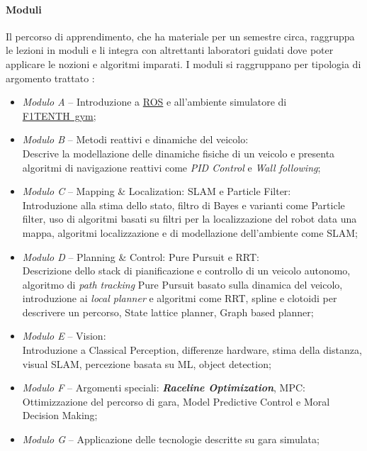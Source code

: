 \paragraph{Moduli}
Il percorso di apprendimento, che ha materiale per un semestre circa,
raggruppa le lezioni in moduli e li integra con altrettanti laboratori guidati
dove poter applicare le nozioni e algoritmi imparati.
\newpage %
\noindent I moduli si raggruppano per tipologia di argomento trattato \cite{f1learn}:
\begin{itemize}
	\item \textit{Modulo A} -- Introduzione a \hyperref[sec:ros]{ROS} e 
		all'ambiente simulatore di \hyperref[par:gym]{F1TENTH~gym};
	\item \textit{Modulo B} -- Metodi reattivi e dinamiche del veicolo: \\
	      Descrive la modellazione delle dinamiche fisiche di un veicolo e presenta algoritmi di navigazione
	      reattivi come \textit{PID Control} e \textit{Wall following};
	\item \textit{Modulo C} -- Mapping \& Localization: SLAM e Particle Filter:\\
	      Introduzione alla stima dello stato, filtro di Bayes e varianti come Particle filter, uso di
	      algoritmi basati su filtri per la localizzazione del robot data una mappa, algoritmi localizzazione e
	      di modellazione dell'ambiente come SLAM;
	\item \textit{Modulo D} -- Planning \& Control: Pure Pursuit e RRT:\\
	      Descrizione dello stack di pianificazione e controllo di un veicolo autonomo, algoritmo di
	      \textit{path tracking} Pure Pursuit basato sulla dinamica del veicolo, introduzione ai
	      \textit{local planner} e algoritmi come RRT, spline e clotoidi per descrivere un percorso,
	      State lattice planner, Graph based planner;
	\item \textit{Modulo E} -- Vision:\\
	      Introduzione a Classical Perception, differenze hardware, stima della distanza, visual SLAM,
	      percezione basata su ML, object detection;
	\item \textit{Modulo F} -- Argomenti speciali: \textbf{\textit{Raceline Optimization}}, MPC:\\
	      Ottimizzazione del percorso di gara, Model Predictive Control e Moral Decision Making;
	\item \textit{Modulo G} -- Applicazione delle tecnologie descritte su gara simulata;
\end{itemize}

